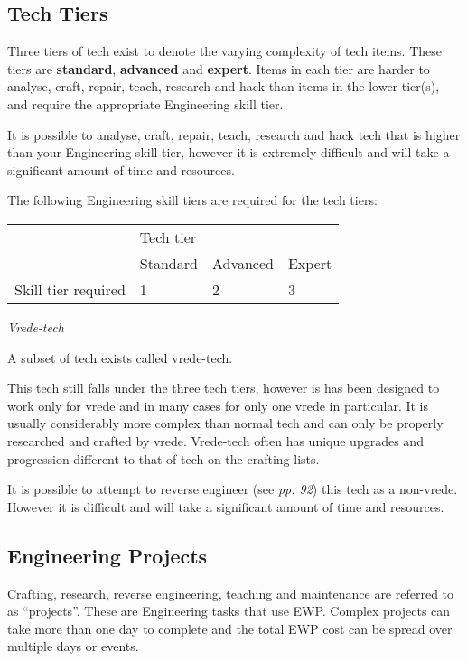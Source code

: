 \documentclass{scrbook}
\begin{document}
\subsection{Tech Tiers}

Three tiers of tech exist to denote the varying complexity of tech items. These tiers are \textbf{standard}, \textbf{advanced} and \textbf{expert}. Items in each tier are harder to analyse, craft, repair, teach, research and hack than items in the lower tier(s), and require the appropriate Engineering skill tier.

It is possible to analyse, craft, repair, teach, research and hack tech that is higher than your Engineering skill tier, however it is extremely difficult and will take a significant amount of time and resources.

The following Engineering skill tiers are required for the tech tiers:

\begin{table}
\begin{tabular}{|l|l|l|l|} \hline 
\multirow{1}{*}{}& \multicolumn{3}{|l|}{Tech tier} \\
\cline{2-2}\cline{3-3}\cline{4-4} & Standard & Advanced & Expert \\
 \hline Skill tier required & 1 & 2 & 3 \\
 \hline \end{tabular}

\end{table}

\textit{Vrede-tech}

A subset of tech exists called vrede-tech.

This tech still falls under the three tech tiers, however is has been designed to work only for vrede and in many cases for only one vrede in particular. It is usually considerably more complex than normal tech and can only be properly researched and crafted by vrede. Vrede-tech often has unique upgrades and progression different to that of tech on the crafting lists.

It is possible to attempt to reverse engineer (see \textit{pp. 92}) this tech as a non-vrede. However it is difficult and will take a significant amount of time and resources.

\subsection{Engineering Projects}

Crafting, research, reverse engineering, teaching and maintenance are referred to as ``projects''. These are Engineering tasks that use EWP. Complex projects can take more than one day to complete and the total EWP cost can be spread over multiple days or events.
\end{document}
